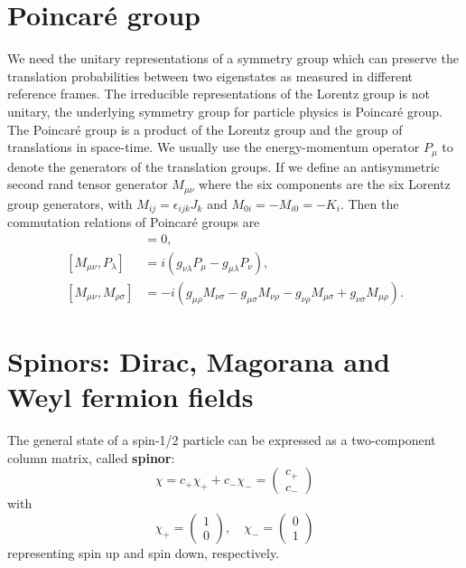 \documentclass[12pt]{report}
\begin{document}
\section{Poincar\'{e} group}
We need the unitary representations of a symmetry group which can preserve the translation probabilities between two eigenstates as measured in different reference frames.
The irreducible representations of the Lorentz group is not unitary, the underlying symmetry group for particle physics is Poincar\'{e} group.
The Poincar\'{e} group is a product of the Lorentz group and the group of translations in space-time.
We usually use the energy-momentum operator $P_{\mu}$ to denote the generators of the translation groups.
If we define an antisymmetric second rand tensor generator $M_{\mu\nu}$ where the six components are the six Lorentz group generators, with $M_{ij} = \epsilon_{ijk} J_{k}$ and $M_{0i} = - M_{i0} = -K_{i}$.
Then the commutation relations of Poincar\'{e} groups are
\begin{align}
[P_{\mu}, P_{\nu}] &= 0 ,\\
[M_{\mu \nu}, P_{\lambda}] &= i (g_{\nu \lambda} P_{\mu} - g_{\mu \lambda} P_{\nu}) ,\\
[M_{\mu \nu}, M_{\rho \sigma}] &= -i (g_{\mu \rho} M_{\nu \sigma} - g_{\mu \sigma} M_{\nu \rho} - g_{\nu \rho} M_{\mu \sigma} + g_{\nu \sigma} M_{\mu \rho}) .
\end{align}



\section{Spinors: Dirac, Magorana and Weyl fermion fields}
The general state of a spin-1/2 particle can be expressed as a two-component column matrix, called \textbf{spinor}:
\begin{equation}
\chi = c_{+} \chi_{+} + c_{-} \chi_{-} = \left(\begin{array}{c}c_{+} \\c_{-}\end{array}\right)
\end{equation}
with
\begin{equation}
\chi_{+} = \left(\begin{array}{c}1 \\0\end{array}\right), \quad 
\chi_{-} = \left(\begin{array}{c}0 \\1\end{array}\right)
\end{equation}
representing spin up and spin down, respectively.
\end{document}
